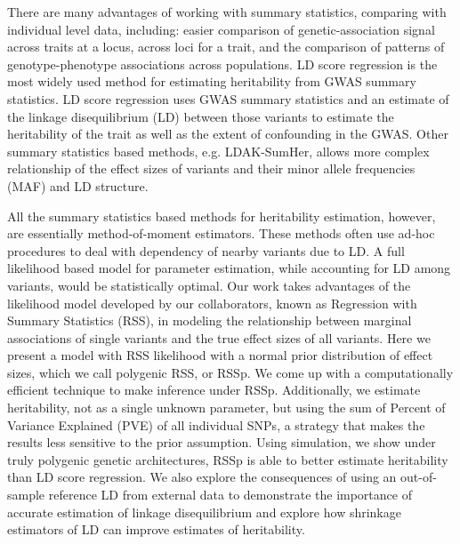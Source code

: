 There are many advantages of working with summary statistics, comparing with individual level data, including: easier comparison of genetic-association signal across traits at a locus\cite{phewas}, across loci for a trait\cite{firstGWAS}, and the comparison of patterns of genotype-phenotype associations across populations\cite{Rosenberg_2010}.
LD score regression is the most widely used method for estimating heritability from GWAS summary statistics.  LD score regression uses GWAS summary statistics and an estimate of the linkage disequilibrium (LD) between those variants to estimate the heritability of the trait as well as the extent of confounding in the GWAS\cite{ldsc}. Other summary statistics based methods, e.g. LDAK-SumHer, allows more complex relationship of the effect sizes of variants and their minor allele frequencies (MAF) and LD structure. 


All the summary statistics based methods for heritability estimation, however, are essentially method-of-moment estimators. These methods often use ad-hoc procedures to deal with dependency of nearby variants due to LD. A full likelihood based model for parameter estimation, while accounting for LD among variants, would be statistically optimal. Our work takes advantages of the likelihood model developed by our collaborators, known as Regression with Summary Statistics (RSS)\cite{Zhu_2017}, in modeling the relationship between marginal associations of single variants and the true effect sizes of all variants. Here we present a model with RSS likelihood with a normal prior distribution of effect sizes, which we call polygenic RSS, or RSSp. We come up with a computationally efficient technique to make inference under RSSp. Additionally, we estimate heritability, not as a single unknown parameter, but using the sum of Percent of Variance Explained (PVE) of all individual SNPs, a strategy that makes the results less sensitive to the prior assumption. 
Using simulation, we show under truly polygenic genetic architectures, RSSp is able to better estimate heritability than LD score regression.
We also explore the consequences of using an out-of-sample reference LD from external data to demonstrate the importance of accurate estimation of linkage disequilibrium and explore how shrinkage estimators of LD can improve estimates of heritability.  

